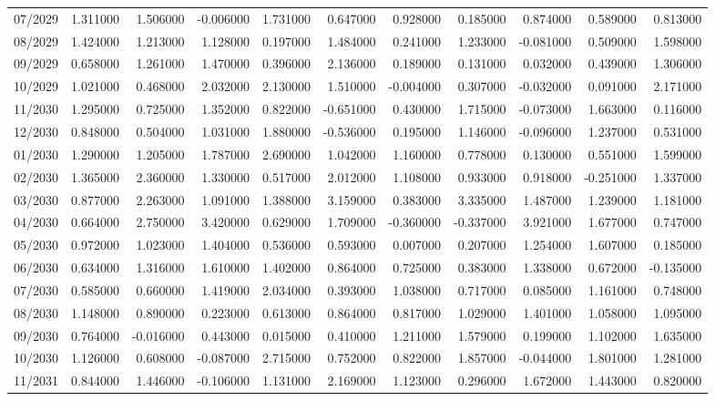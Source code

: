 \begin{tabular}{lrrrrrrrrrr}
07/2029 & 1.311000 & 1.506000 & -0.006000 & 1.731000 & 0.647000 & 0.928000 & 0.185000 & 0.874000 & 0.589000 & 0.813000 \\
08/2029 & 1.424000 & 1.213000 & 1.128000 & 0.197000 & 1.484000 & 0.241000 & 1.233000 & -0.081000 & 0.509000 & 1.598000 \\
09/2029 & 0.658000 & 1.261000 & 1.470000 & 0.396000 & 2.136000 & 0.189000 & 0.131000 & 0.032000 & 0.439000 & 1.306000 \\
10/2029 & 1.021000 & 0.468000 & 2.032000 & 2.130000 & 1.510000 & -0.004000 & 0.307000 & -0.032000 & 0.091000 & 2.171000 \\
11/2030 & 1.295000 & 0.725000 & 1.352000 & 0.822000 & -0.651000 & 0.430000 & 1.715000 & -0.073000 & 1.663000 & 0.116000 \\
12/2030 & 0.848000 & 0.504000 & 1.031000 & 1.880000 & -0.536000 & 0.195000 & 1.146000 & -0.096000 & 1.237000 & 0.531000 \\
01/2030 & 1.290000 & 1.205000 & 1.787000 & 2.690000 & 1.042000 & 1.160000 & 0.778000 & 0.130000 & 0.551000 & 1.599000 \\
02/2030 & 1.365000 & 2.360000 & 1.330000 & 0.517000 & 2.012000 & 1.108000 & 0.933000 & 0.918000 & -0.251000 & 1.337000 \\
03/2030 & 0.877000 & 2.263000 & 1.091000 & 1.388000 & 3.159000 & 0.383000 & 3.335000 & 1.487000 & 1.239000 & 1.181000 \\
04/2030 & 0.664000 & 2.750000 & 3.420000 & 0.629000 & 1.709000 & -0.360000 & -0.337000 & 3.921000 & 1.677000 & 0.747000 \\
05/2030 & 0.972000 & 1.023000 & 1.404000 & 0.536000 & 0.593000 & 0.007000 & 0.207000 & 1.254000 & 1.607000 & 0.185000 \\
06/2030 & 0.634000 & 1.316000 & 1.610000 & 1.402000 & 0.864000 & 0.725000 & 0.383000 & 1.338000 & 0.672000 & -0.135000 \\
07/2030 & 0.585000 & 0.660000 & 1.419000 & 2.034000 & 0.393000 & 1.038000 & 0.717000 & 0.085000 & 1.161000 & 0.748000 \\
08/2030 & 1.148000 & 0.890000 & 0.223000 & 0.613000 & 0.864000 & 0.817000 & 1.029000 & 1.401000 & 1.058000 & 1.095000 \\
09/2030 & 0.764000 & -0.016000 & 0.443000 & 0.015000 & 0.410000 & 1.211000 & 1.579000 & 0.199000 & 1.102000 & 1.635000 \\
10/2030 & 1.126000 & 0.608000 & -0.087000 & 2.715000 & 0.752000 & 0.822000 & 1.857000 & -0.044000 & 1.801000 & 1.281000 \\
11/2031 & 0.844000 & 1.446000 & -0.106000 & 1.131000 & 2.169000 & 1.123000 & 0.296000 & 1.672000 & 1.443000 & 0.820000 \\

\end{tabular}
